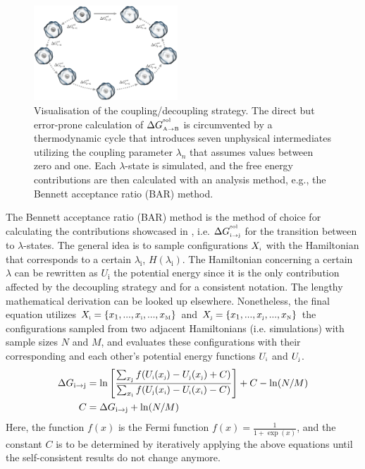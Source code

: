 \documentclass[9pt,tutorial]{livecoms}
\begin{document}
\begin{figure}[H]
    \centering
    \includegraphics[width=0.48\textwidth]{figures/thermodynamicCycleLambda.png}
    \caption{Visualisation of the coupling/decoupling strategy. The direct but error-prone calculation of $\Delta G_\text{\tiny A$\to$B}^{^\text{sol}}$ is circumvented by a thermodynamic cycle that introduces seven unphysical intermediates utilizing the coupling parameter $\lambda_n$ that assumes values between zero and one. Each $\lambda$-state is simulated, and the free energy contributions are then calculated with an analysis method, e.g., the Bennett acceptance ratio (BAR) method.}
    \label{fig:thermodynamiccyclelambda}
\end{figure}

The Bennett acceptance ratio (BAR) method\cite{Bennett1976} is the method of choice for calculating the contributions showcased in , i.e. $\Delta G_\text{\tiny i$\to$j}^{^\text{sol}}$ for the transition between to $\lambda$-states. The general idea is to sample configurations $X_\text{\tiny i}$ with the Hamiltonian that corresponds to a certain $\lambda_\text{i}$, $H(\lambda_\text{i})$. The Hamiltonian concerning a certain $\lambda$ can be rewritten as $U_\text{i}$ the potential energy since it is the only contribution affected by the decoupling strategy and for a consistent notation. The lengthy mathematical derivation can be looked up elsewhere\cite{Bennett1976}. Nonetheless, the final equation utilizes $X_\text{\tiny i} = \{x_1,...,x_\text{\tiny i},..., x_\text{\tiny M}\}$ and $X_\text{\tiny j} = \{x_1,...,x_\text{\tiny j},..., x_\text{\tiny N}\}$ the configurations sampled from two adjacent Hamiltonians (i.e. simulations) with sample sizes $N$ and $M$, and evaluates these configurations with their corresponding and each other's potential energy functions $U_\text{\tiny i}$ and $U_\text{\tiny j}$.
\begin{align}\label{eq:barmethod}
    \Delta G_\text{i$\to$j} & = \ln\left[\frac{\sum_{x_\text{\tiny j}}f(U_\text{\tiny i}(x_\text{\tiny j}) - U_\text{\tiny j}(x_\text{\tiny j}) + C)}{\sum_{x_\text{\tiny i}}f(U_\text{\tiny j}(x_\text{\tiny i}) - U_\text{\tiny i}(x_\text{\tiny i}) - C)}\right] + C - \ln(N/M) \\
    C & = \Delta G_\text{i$\to$j} + \ln(N/M)
\end{align}
Here, the function $f(x)$ is the Fermi function $f(x) = \frac{1}{1+\exp(x)}$, and the constant $C$ is to be determined by iteratively applying the above equations until the self-consistent results do not change anymore. 
\end{document}
